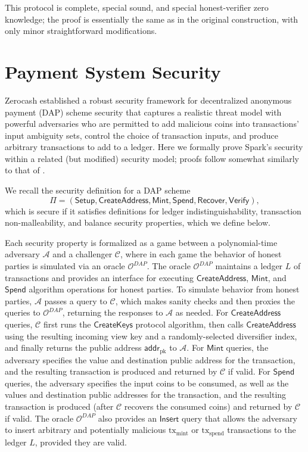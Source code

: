 \documentclass{llncs}
\newcommand{\func}[1]{\mathsf{#1}}
\newcommand{\addr}{\func{addr}}
\begin{document}
This protocol is complete, special sound, and special honest-verifier zero knowledge; the proof is essentially the same as in the original construction, with only minor straightforward modifications.


\section{Payment System Security}
\label{app:security}
 
Zerocash \cite{zerocash} established a robust security framework for decentralized anonymous payment (DAP) scheme security that captures a realistic threat model with powerful adversaries who are permitted to add malicious coins into transactions' input ambiguity sets, control the choice of transaction inputs, and produce arbitrary transactions to add to a ledger.
Here we formally prove Spark's security within a related (but modified) security model; proofs follow somewhat similarly to that of \cite{zerocash}.

We recall the security definition for a DAP scheme $$\Pi = (\func{Setup}, \func{CreateAddress}, \func{Mint}, \func{Spend}, \func{Recover}, \func{Verify}),$$ which is secure if it satisfies definitions for ledger indistinguishability, transaction non-malleability, and balance security properties, which we define below.

Each security property is formalized as a game between a polynomial-time adversary $\mathcal{A}$ and a challenger $\mathcal{C}$, where in each game the behavior of honest parties is simulated via an oracle $\mathcal{O}^{DAP}$.
The oracle $\mathcal{O}^{DAP}$ maintains a ledger $L$ of transactions and provides an interface for executing $\func{CreateAddress}$, $\func{Mint}$, and $\func{Spend}$ algorithm operations for honest parties.
To simulate behavior from honest parties, $\mathcal{A}$ passes a query to $\mathcal{C}$, which makes sanity checks and then proxies the queries to $\mathcal{O}^{DAP}$, returning the responses to $\mathcal{A}$ as needed.
For $\func{CreateAddress}$ queries, $\mathcal{C}$ first runs the $\func{CreateKeys}$ protocol algorithm, then calls $\func{CreateAddress}$ using the resulting incoming view key and a randomly-selected diversifier index, and finally returns the public address $\addr_{\text{pk}}$ to $\mathcal{A}$.
For $\func{Mint}$ queries, the adversary specifies the value and destination public address for the transaction, and the resulting transaction is produced and returned by $\mathcal{C}$ if valid.
For $\func{Spend}$ queries, the adversary specifies the input coins to be consumed, as well as the values and destination public addresses for the transaction, and the resulting transaction is produced (after $\mathcal{C}$ recovers the consumed coins) and returned by $\mathcal{C}$ if valid.
The oracle $\mathcal{O}^{DAP}$ also provides an $\func{Insert}$ query that allows the adversary to insert arbitrary and potentially malicious $\text{tx}_{\text{mint}}$ or $\text{tx}_{\text{spend}}$ transactions to the ledger $L$, provided they are valid.
\end{document}
